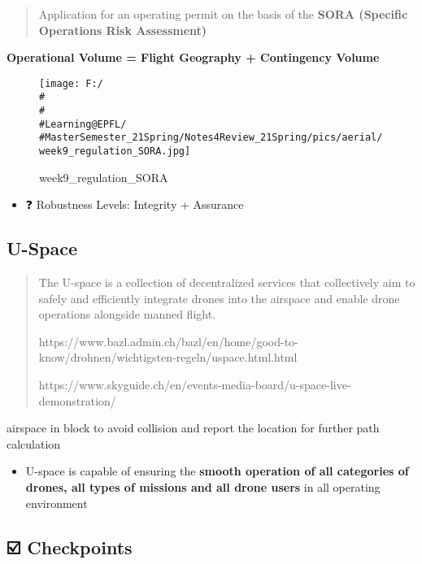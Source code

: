 \documentclass[]{article}
\begin{document}
\begin{quote}
Application for an operating permit on the basis of the \textbf{SORA
(Specific Operations Risk Assessment)}
\end{quote}

\textbf{Operational Volume = Flight Geography + Contingency Volume }

\begin{figure}
\centering
\texttt{[image: F:/\\\#\\\#\\\#Learning@EPFL/\\\#MasterSemester\_21Spring/Notes4Review\_21Spring/pics/aerial/week9\_regulation\_SORA.jpg]}
\caption{week9\_regulation\_SORA}
\end{figure}

\begin{itemize}
\item
  ❓ Robustness Levels: Integrity + Assurance
\end{itemize}

\subsection{U-Space}\label{header-n1782}

\begin{quote}
The U-space is a collection of decentralized services that collectively
aim to safely and efficiently integrate drones into the airspace and
enable drone operations alongside manned flight.

https://www.bazl.admin.ch/bazl/en/home/good-to-know/drohnen/wichtigsten-regeln/uspace.html.html

https://www.skyguide.ch/en/events-media-board/u-space-live-demonstration/
\end{quote}

airspace in block to avoid collision and report the location for further
path calculation

\begin{itemize}
\item
  U-space is capable of ensuring the \textbf{smooth operation of all
  categories of drones, all types of missions and all drone users} in
  all operating environment
\end{itemize}

\subsection{☑️ Checkpoints}\label{header-n1791}
\end{document}
